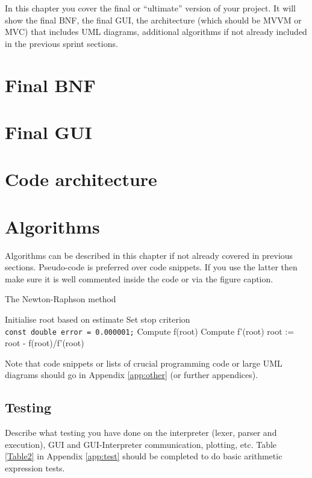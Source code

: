 \documentclass[a4paper, oneside, 11pt]{report}
\begin{document}
In this chapter you cover the final or ``ultimate'' version of your project. It will show the final BNF, the final GUI, the architecture (which should be MVVM or MVC) that includes UML diagrams, additional algorithms if not already included in the previous sprint sections.

\section{Final BNF}

\section{Final GUI}

\section{Code architecture}

\section{Algorithms}

Algorithms can be described in this chapter if not already covered in previous sections. Pseudo-code is preferred over code snippets. If you use the latter then make sure it is well commented inside the code or via the figure caption. 

\begin{algorithm}[th]
\caption{ The Newton-Raphson method }
\begin{algorithmic}[1]
\STATE Initialise root based on estimate
\STATE Set stop criterion
\\ \texttt{const double error = 0.000001;}
	\STATE Compute f(root)
	\STATE Compute f'(root)
	\STATE root := root - f(root)/f'(root)
\ENDWHILE
\end{algorithmic}
\end{algorithm}


Note that code snippets or lists of crucial programming code or large UML diagrams should go in Appendix \ref{app:other} (or further appendices).

\subsection{Testing}

Describe what testing you have done on the interpreter (lexer, parser and execution), GUI and GUI-Interpreter communication, plotting, etc. Table \ref{Table2} in Appendix \ref{app:test} should be completed to do basic arithmetic expression tests.
\end{document}
